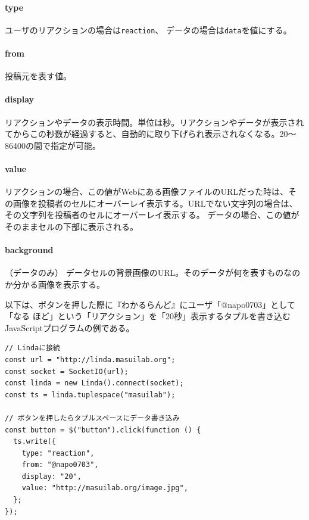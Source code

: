 \vspace{4mm}
\paragraph*{type}
ユーザのリアクションの場合は\texttt{reaction}、
データの場合は\texttt{data}を値にする。

\vspace{4mm}
\paragraph*{from}
投稿元を表す値。

\vspace{2mm}
\paragraph*{display}
リアクションやデータの表示時間。単位は秒。リアクションやデータが表示されてからこの秒数が経過すると、自動的に取り下げられ表示されなくなる。20〜86400の間で指定が可能。

\vspace{2mm}
\paragraph*{value}
リアクションの場合、この値がWebにある画像ファイルのURLだった時は、その画像を投稿者のセルにオーバーレイ表示する。URLでない文字列の場合は、その文字列を投稿者のセルにオーバーレイ表示する。
データの場合、この値がそのままセルの下部に表示される。

\vspace{4mm}
\paragraph*{background}（データのみ）
データセルの背景画像のURL。そのデータが何を表すものなのか分かる画像を表示する。

\vspace{2mm}
以下は、ボタンを押した際に『わかるらんど』にユーザ「@napo0703」として「なる ほど」という「リアクション」を「20秒」表示するタプルを書き込むJavaScriptプログラムの例である。

\vspace{2mm}
\begin{lstlisting}
// Lindaに接続
const url = "http://linda.masuilab.org";
const socket = SocketIO(url);
const linda = new Linda().connect(socket);
const ts = linda.tuplespace("masuilab");

// ボタンを押したらタプルスペースにデータ書き込み
const button = $("button").click(function () {
  ts.write({
    type: "reaction",
    from: "@napo0703",
    display: "20",
    value: "http://masuilab.org/image.jpg",
  };
});
\end{lstlisting}

